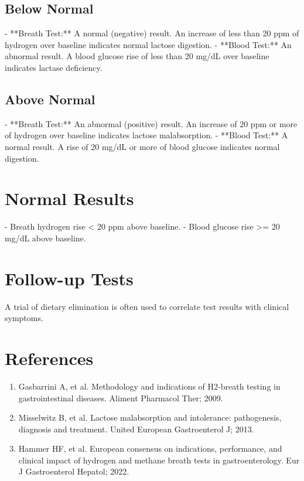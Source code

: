 \subsection*{Below Normal}
- **Breath Test:** A normal (negative) result. An increase of less than 20 ppm of hydrogen over baseline indicates normal lactose digestion.
- **Blood Test:** An abnormal result. A blood glucose rise of less than 20 mg/dL over baseline indicates lactase deficiency.

\subsection*{Above Normal}
- **Breath Test:** An abnormal (positive) result. An increase of 20 ppm or more of hydrogen over baseline indicates lactose malabsorption.
- **Blood Test:** A normal result. A rise of 20 mg/dL or more of blood glucose indicates normal digestion.

\section*{Normal Results}
- Breath hydrogen rise < 20 ppm above baseline.
- Blood glucose rise >= 20 mg/dL above baseline.

\section*{Follow-up Tests}
A trial of dietary elimination is often used to correlate test results with clinical symptoms.

\section*{References}
\begin{enumerate}
  \item Gasbarrini A, et al. Methodology and indications of H2-breath testing in gastrointestinal diseases. Aliment Pharmacol Ther; 2009.
  \item Misselwitz B, et al. Lactose malabsorption and intolerance: pathogenesis, diagnosis and treatment. United European Gastroenterol J; 2013.
  \item Hammer HF, et al. European consensus on indications, performance, and clinical impact of hydrogen and methane breath tests in gastroenterology. Eur J Gastroenterol Hepatol; 2022.
\end{enumerate}

\clearpage
